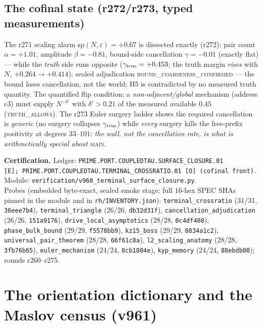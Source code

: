 \documentclass[11pt]{article}
\newcommand{\certbox}[3]{%
  \par\medskip\noindent\colorbox{certgray}{\parbox{\dimexpr\linewidth-2\fboxsep}{%
    \footnotesize\raggedright\textbf{Certification.} Ledger: \texttt{#1}.\quad
    Module: \texttt{#2}.\\ #3}}\par\medskip}
\theoremstyle{definition}
\theoremstyle{remark}
\begin{document}
\subsection{The cofinal state (r272/r273, typed measurements)}
The r271 scaling alarm $\mathrm{sp}(N,\varepsilon)=+0.67$ is dissected
exactly (r272): pair count $\alpha=+1.01$, amplitude $\beta=-0.81$,
bound-side cancellation $\gamma=-0.01$ (exactly flat) --- while the
\emph{truth} side runs opposite ($\gamma_{\rm true}=+0.453$; the truth
margin \emph{rises} with $N$, $+0.264\to+0.414$): sealed adjudication
\textsc{bound\_coarseness\_confirmed} --- the bound loses cancellation,
not the world; H5 is contradicted by no measured truth quantity.  The
quantified flip condition: a \emph{non-adjacent/global} mechanism
(address c3) must supply $N^{-\delta'}$ with $\delta'>0.21$ of the
measured available $0.45$ (\textsc{truth\_allows}).  The r273 Euler
surgery ladder shows the required cancellation is \emph{generic} (no
surgery collapses $\gamma_{\rm true}$) while \emph{every} surgery kills
the free-prefix positivity at degrees $33$--$101$: \emph{the wall, not
the cancellation rate, is what is arithmetically special about}
\textsc{main}.

\certbox{PRIME.PORT.COUPLEDTAU.SURFACE\_CLOSURE.01 [E];\
PRIME.PORT.COUPLEDTAU.TERMINAL\_CROSSRATIO.01 [O] (cofinal front)}%
{verification/v960\_terminal\_surface\_closure.py}%
{Probes (embedded byte-exact, sealed smoke stage; full 16-hex SPEC SHAs
pinned in the module and in \texttt{rh/INVENTORY.json}):
\texttt{terminal\_crossratio} (31/31, \texttt{36eee7b4}),
\texttt{terminal\_triangle} (26/26, \texttt{db32d31f}),
\texttt{cancellation\_adjudication} (26/26, \texttt{151a9176}),
\texttt{drive\_local\_asymptotics} (28/28, \texttt{0c4df408}),
\texttt{phase\_bulk\_bound} (29/29, \texttt{f5578bb9}),
\texttt{kz15\_boss} (29/29, \texttt{8834a1c2}),
\texttt{universal\_pair\_theorem} (28/28, \texttt{66f61c8a}),
\texttt{l2\_scaling\_anatomy} (28/28, \texttt{3fb76b65}),
\texttt{euler\_mechanism} (24/24, \texttt{8cb1804e}),
\texttt{kyp\_memory} (24/24, \texttt{88ebdb00}); rounds r260--r275.}

\section{The orientation dictionary and the Maslov census (v961)}
\label{sec:orientation}
\end{document}
